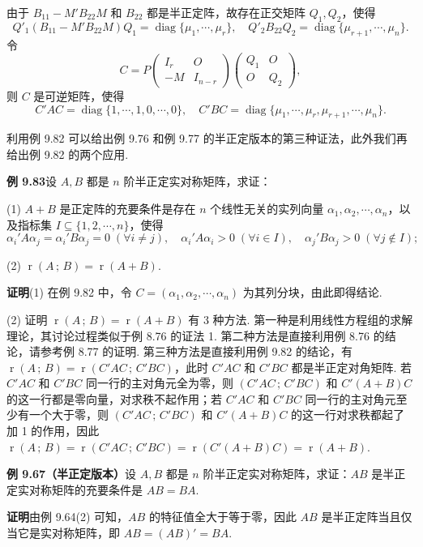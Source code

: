 \documentclass[UTF8, 12pt, fontset=fandol, oneside]{ctexart}
\begin{document}
由于 $B_{11}-M'B_{22}M$ 和 $B_{22}$ 都是半正定阵，故存在正交矩阵 $Q_1,Q_2$，使得
\[
Q'_1(B_{11}-M'B_{22}M)Q_1=\operatorname{diag}\{\mu_1,\cdots,\mu_r\},\quad
Q'_2B_{22}Q_2=\operatorname{diag}\{\mu_{r+1},\cdots,\mu_n\}.
\]
令
\[
C=P\begin{pmatrix}
I_r&O\\
-M&I_{n-r}
\end{pmatrix}
\begin{pmatrix}
Q_1&O\\
O&Q_2
\end{pmatrix},
\]
则 $C$ 是可逆矩阵，使得
\[
C'AC=\operatorname{diag}\{1,\cdots,1,0,\cdots,0\},\quad
C'BC=\operatorname{diag}\{\mu_1,\cdots,\mu_r,\mu_{r+1},\cdots,\mu_n\}.
\]

利用例 9.82 可以给出例 9.76 和例 9.77 的半正定版本的第三种证法，此外我们再给出例 9.82 的两个应用.

\noindent\textbf{例 9.83}\quad 设 $A,B$ 都是 $n$ 阶半正定实对称矩阵，求证：

(1) $A+B$ 是正定阵的充要条件是存在 $n$ 个线性无关的实列向量 $\alpha_1,\alpha_2,\cdots,\alpha_n$，以及指标集 $I\subseteq\{1,2,\cdots,n\}$，使得
\[
\alpha_i'A\alpha_j=\alpha_i'B\alpha_j=0\;(\forall i\ne j),\quad
\alpha_i'A\alpha_i>0\;(\forall i\in I),\quad
\alpha_j'B\alpha_j>0\;(\forall j\notin I);
\]

(2) $\operatorname{r}(A\,;\,B)=\operatorname{r}(A+B)$.

\noindent\textbf{证明}\quad (1) 在例 9.82 中，令 $C=(\alpha_1,\alpha_2,\cdots,\alpha_n)$ 为其列分块，由此即得结论.

(2) 证明 $\operatorname{r}(A\,;\,B)=\operatorname{r}(A+B)$ 有 3 种方法. 第一种是利用线性方程组的求解理论，其讨论过程类似于例 8.76 的证法 1. 第二种方法是直接利用例 8.76 的结论，请参考例 8.77 的证明. 第三种方法是直接利用例 9.82 的结论，有 $\operatorname{r}(A\,;\,B)=\operatorname{r}(C'AC\,;\,C'BC)$，此时 $C'AC$ 和 $C'BC$ 都是半正定对角矩阵. 若 $C'AC$ 和 $C'BC$ 同一行的主对角元全为零，则 $(C'AC\,;\,C'BC)$ 和 $C'(A+B)C$ 的这一行都是零向量，对求秩不起作用；若 $C'AC$ 和 $C'BC$ 同一行的主对角元至少有一个大于零，则 $(C'AC\,;\,C'BC)$ 和 $C'(A+B)C$ 的这一行对求秩都起了加 1 的作用，因此 $\operatorname{r}(A\,;\,B)=\operatorname{r}(C'AC\,;\,C'BC)=\operatorname{r}(C'(A+B)C)=\operatorname{r}(A+B)$.

\noindent\textbf{例 9.67（半正定版本）}\quad 设 $A,B$ 都是 $n$ 阶半正定实对称矩阵，求证：$AB$ 是半正定实对称矩阵的充要条件是 $AB=BA$.

\noindent\textbf{证明}\quad 由例 9.64(2) 可知，$AB$ 的特征值全大于等于零，因此 $AB$ 是半正定阵当且仅当它是实对称矩阵，即 $AB=(AB)'=BA$.
\end{document}
